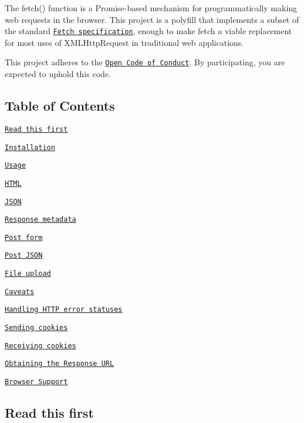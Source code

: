 The {\ttfamily fetch()} function is a Promise-\/based mechanism for programmatically making web requests in the browser. This project is a polyfill that implements a subset of the standard \href{https://fetch.spec.whatwg.org}{\tt Fetch specification}, enough to make {\ttfamily fetch} a viable replacement for most uses of X\+M\+L\+Http\+Request in traditional web applications.

This project adheres to the \href{http://todogroup.org/opencodeofconduct/#fetch/opensource@github.com}{\tt Open Code of Conduct}. By participating, you are expected to uphold this code.

\subsection*{Table of Contents}


\begin{DoxyItemize}
\item \href{#read-this-first}{\tt Read this first}
\item \href{#installation}{\tt Installation}
\item \href{#usage}{\tt Usage}
\begin{DoxyItemize}
\item \href{#html}{\tt H\+T\+ML}
\item \href{#json}{\tt J\+S\+ON}
\item \href{#response-metadata}{\tt Response metadata}
\item \href{#post-form}{\tt Post form}
\item \href{#post-json}{\tt Post J\+S\+ON}
\item \href{#file-upload}{\tt File upload}
\item \href{#caveats}{\tt Caveats}
\begin{DoxyItemize}
\item \href{#handling-http-error-statuses}{\tt Handling H\+T\+TP error statuses}
\item \href{#sending-cookies}{\tt Sending cookies}
\item \href{#receiving-cookies}{\tt Receiving cookies}
\item \href{#obtaining-the-response-url}{\tt Obtaining the Response U\+RL}
\end{DoxyItemize}
\end{DoxyItemize}
\item \href{#browser-support}{\tt Browser Support}
\end{DoxyItemize}

\subsection*{Read this first}


